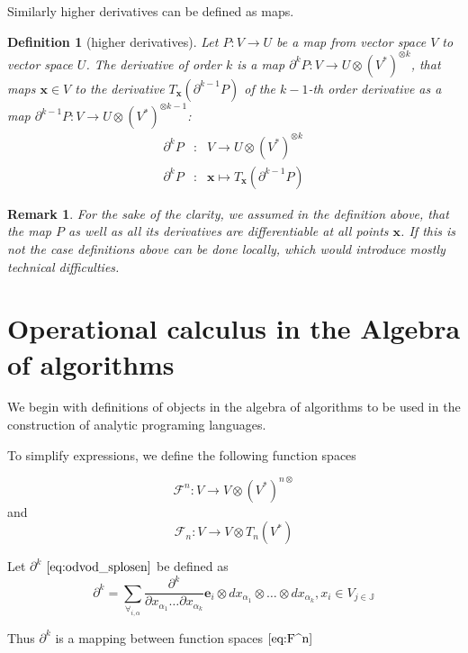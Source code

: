 \documentclass{article}
\newcommand{\JJ}{\mathbb{J}}
\newcommand{\e}{\mathbf{e}}
\newcommand{\x}{\mathbf{x}}
\newcommand{\F}{\mathcal{F}}
\newcommand{\D}{\partial}
\newtheorem{definicija}{Definition}[section]
\newtheorem{opomba}{Remark}[section]
\begin{document}
Similarly higher derivatives can be defined as maps.
\begin{definicija}[higher derivatives]
  Let $P:V\to U$ be a map from vector space $V$ to vector space $U$. 
The derivative of order $k$ is a map $\D^kP:V\to U\otimes(V^*)^{\otimes k}$,
that maps $\x\in V$ to the derivative  $T_\x(\D^{k-1}P)$ of the $k-1$-th order
derivative as a map $\D^{k-1}P: V\to U\otimes (V^*)^{\otimes k-1}$:
  \begin{eqnarray}\label{eq:partial}
    \label{eq:visji_odvod}
    \D^kP&:&V\to U\otimes (V^*)^{\otimes k}\\
    \D^kP&:&\x\mapsto T_\x\left( \D^{k-1}P \right)
  \end{eqnarray}
\end{definicija} 
\begin{opomba}
  For the sake of the clarity, we assumed in the definition above, that the map $P$ as well as all its
  derivatives are differentiable at all points $\x$. If this is not the case
  definitions above can be done locally, which would introduce mostly technical difficulties.
\end{opomba}

\section{Operational calculus in the Algebra of algorithms}

We begin with definitions of objects in the algebra of algorithms to be used in the construction of analytic programing languages.

To simplify expressions, we define the following function spaces

 \begin{equation}\label{eq:F^n}
 	\F^n:V\to V\otimes(V^*)^{n\otimes}
 \end{equation}
 and
 \begin{equation}\label{eq:F_n}
 	\F_n:V\to V\otimes T_n(V^*)
 \end{equation}
 
Let $\D^k$ $\eqref{eq:odvod_splosen}$ be defined as
\begin{equation}\label{eq:dd}
	\partial^k=\sum_{\forall_{i,\alpha}}\frac{\partial^k}{\partial
	    x_{\alpha_1}\ldots \partial x_{\alpha_k}}\e_i\otimes
	  dx_{\alpha_1}\otimes\ldots \otimes dx_{\alpha_k} , x_i\in V_{j\in\JJ}
\end{equation}

Thus $\D^k$ is a mapping between function spaces $\eqref{eq:F^n}$
 
\end{document}
